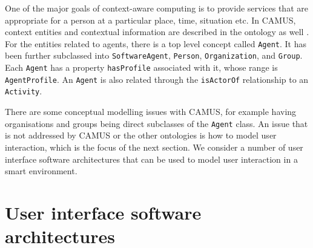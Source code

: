 One of the major goals of context-aware computing is to provide services that are appropriate for a person at a particular place, time, situation etc. In \ac{CAMUS}, context entities and contextual information are described in the ontology as well \cite{Ngo2004}. For the entities related to agents, there is a top level concept called \texttt{Agent}. It has been further subclassed into \texttt{SoftwareAgent}, \texttt{Person}, \texttt{Organization}, and \texttt{Group}. Each \texttt{Agent} has a property \texttt{hasProfile} associated with it, whose range is \texttt{AgentProfile}. An \texttt{Agent} is also related through the \texttt{isActorOf} relationship to an \texttt{Activity}. %

There are some conceptual modelling issues with \ac{CAMUS}, for example having organisations and groups being direct subclasses of the \texttt{Agent} class. An issue that is not addressed by \ac{CAMUS} or the other ontologies is how to model user interaction, which is the focus of the next section. We consider a number of user interface software architectures that can be used to model user interaction in a smart environment.



\section{User interface software architectures}
\label{uisa}



